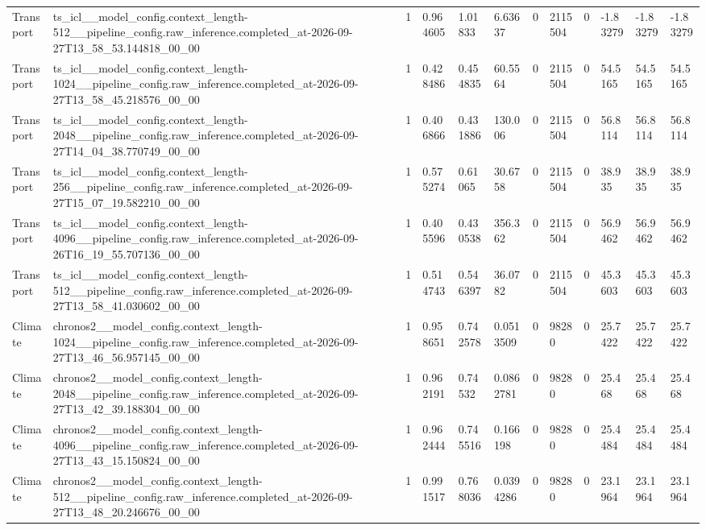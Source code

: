 \begin{tabular}{llllllllllll}
Transport & ts\_icl\_\_model\_config.context\_length-512\_\_pipeline\_config.raw\_inference.completed\_at-2026-09-27T13\_58\_53.144818\_00\_00 & 1 & 0.964605 & 1.01833 & 6.63637 & 0 & 2115504 & 0 & -1.83279 & -1.83279 & -1.83279 \\
Transport & ts\_icl\_\_model\_config.context\_length-1024\_\_pipeline\_config.raw\_inference.completed\_at-2026-09-27T13\_58\_45.218576\_00\_00 & 1 & 0.428486 & 0.454835 & 60.5564 & 0 & 2115504 & 0 & 54.5165 & 54.5165 & 54.5165 \\
Transport & ts\_icl\_\_model\_config.context\_length-2048\_\_pipeline\_config.raw\_inference.completed\_at-2026-09-27T14\_04\_38.770749\_00\_00 & 1 & 0.406866 & 0.431886 & 130.006 & 0 & 2115504 & 0 & 56.8114 & 56.8114 & 56.8114 \\
Transport & ts\_icl\_\_model\_config.context\_length-256\_\_pipeline\_config.raw\_inference.completed\_at-2026-09-27T15\_07\_19.582210\_00\_00 & 1 & 0.575274 & 0.61065 & 30.6758 & 0 & 2115504 & 0 & 38.935 & 38.935 & 38.935 \\
Transport & ts\_icl\_\_model\_config.context\_length-4096\_\_pipeline\_config.raw\_inference.completed\_at-2026-09-26T16\_19\_55.707136\_00\_00 & 1 & 0.405596 & 0.430538 & 356.362 & 0 & 2115504 & 0 & 56.9462 & 56.9462 & 56.9462 \\
Transport & ts\_icl\_\_model\_config.context\_length-512\_\_pipeline\_config.raw\_inference.completed\_at-2026-09-27T13\_58\_41.030602\_00\_00 & 1 & 0.514743 & 0.546397 & 36.0782 & 0 & 2115504 & 0 & 45.3603 & 45.3603 & 45.3603 \\
Climate & chronos2\_\_model\_config.context\_length-1024\_\_pipeline\_config.raw\_inference.completed\_at-2026-09-27T13\_46\_56.957145\_00\_00 & 1 & 0.958651 & 0.742578 & 0.0513509 & 0 & 98280 & 0 & 25.7422 & 25.7422 & 25.7422 \\
Climate & chronos2\_\_model\_config.context\_length-2048\_\_pipeline\_config.raw\_inference.completed\_at-2026-09-27T13\_42\_39.188304\_00\_00 & 1 & 0.962191 & 0.74532 & 0.0862781 & 0 & 98280 & 0 & 25.468 & 25.468 & 25.468 \\
Climate & chronos2\_\_model\_config.context\_length-4096\_\_pipeline\_config.raw\_inference.completed\_at-2026-09-27T13\_43\_15.150824\_00\_00 & 1 & 0.962444 & 0.745516 & 0.166198 & 0 & 98280 & 0 & 25.4484 & 25.4484 & 25.4484 \\
Climate & chronos2\_\_model\_config.context\_length-512\_\_pipeline\_config.raw\_inference.completed\_at-2026-09-27T13\_48\_20.246676\_00\_00 & 1 & 0.991517 & 0.768036 & 0.0394286 & 0 & 98280 & 0 & 23.1964 & 23.1964 & 23.1964 \\

\end{tabular}
